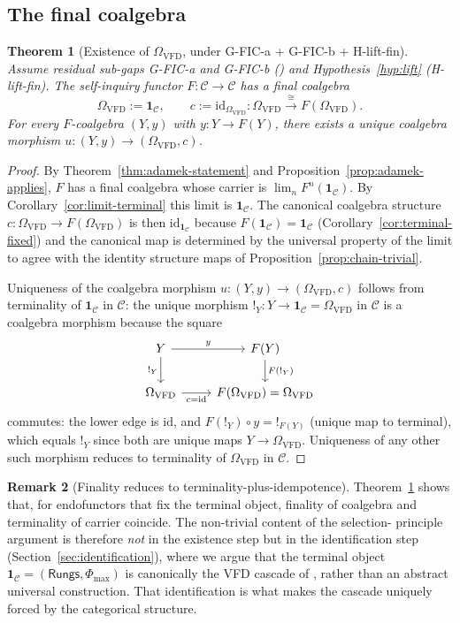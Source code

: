 \documentclass[11pt, a4paper]{amsart}
\newtheorem{theorem}{Theorem}[section]
\theoremstyle{definition}
\newtheorem{remark}[theorem]{Remark}
\newcommand{\Rungs}{\mathsf{Rungs}}
\newcommand{\catC}{\mathcal{C}}
\newcommand{\Omegacap}{\Omega_{\mathrm{VFD}}}
\begin{document}
\subsection{The final coalgebra}

\begin{theorem}[Existence of $\Omegacap$, under G-FIC-a +
  G-FIC-b + H-lift-fin]
\label{thm:existence}
Assume residual sub-gaps G-FIC-a and G-FIC-b
(\cite{CascadeHFICClosure}) and
Hypothesis~\ref{hyp:lift} (H-lift-fin). The self-inquiry
functor $F \colon \catC \to \catC$ has a final coalgebra
\[
    \Omegacap := \mathbf{1}_\catC,
    \qquad
    c := \mathrm{id}_{\Omegacap} \colon \Omegacap
    \xrightarrow{\;\cong\;} F(\Omegacap).
\]
For every $F$-coalgebra $(Y, y)$ with $y \colon Y \to F(Y)$,
there exists a unique coalgebra morphism
$u \colon (Y, y) \to (\Omegacap, c)$.
\end{theorem}

\begin{proof}
By Theorem~\ref{thm:adamek-statement} and
Proposition~\ref{prop:adamek-applies}, $F$ has a final coalgebra
whose carrier is $\lim_n F^n(\mathbf{1}_\catC)$. By
Corollary~\ref{cor:limit-terminal} this limit is
$\mathbf{1}_\catC$. The canonical coalgebra structure
$c \colon \Omegacap \to F(\Omegacap)$ is then
$\mathrm{id}_{\mathbf{1}_\catC}$ because $F(\mathbf{1}_\catC) =
\mathbf{1}_\catC$ (Corollary~\ref{cor:terminal-fixed}) and the
canonical map is determined by the universal property of the
limit to agree with the identity structure maps of
Proposition~\ref{prop:chain-trivial}.

Uniqueness of the coalgebra morphism $u \colon (Y, y) \to
(\Omegacap, c)$ follows from terminality of $\mathbf{1}_\catC$
in $\catC$: the unique morphism $!_Y \colon Y \to
\mathbf{1}_\catC = \Omegacap$ in $\catC$ is a coalgebra morphism
because the square
\[
    \begin{tikzcd}
    Y \arrow[r, "y"] \arrow[d, "!_Y"'] &
      F(Y) \arrow[d, "F(!_Y)"] \\
    \Omegacap \arrow[r, "c = \mathrm{id}"'] &
      F(\Omegacap) = \Omegacap
    \end{tikzcd}
\]
commutes: the lower edge is $\mathrm{id}$, and $F(!_Y) \circ y =
!_{F(Y)}$ (unique map to terminal), which equals $!_Y$ since
both are unique maps $Y \to \Omegacap$. Uniqueness of any other
such morphism reduces to terminality of $\Omegacap$ in $\catC$.
\end{proof}

\begin{remark}[Finality reduces to terminality-plus-idempotence]
\label{rmk:finality-terminal}
Theorem~\ref{thm:existence} shows that, for endofunctors that
fix the terminal object, finality of coalgebra and terminality
of carrier coincide. The non-trivial content of the selection-
principle argument is therefore \emph{not} in the existence
step but in the identification step
(Section~\ref{sec:identification}), where we argue that the
terminal object $\mathbf{1}_\catC = (\Rungs, \Phi_{\max})$ is
canonically the VFD cascade of
\cite{CascadeCompletenessAudit}, rather than an abstract
universal construction. That identification is what makes the
cascade uniquely forced by the categorical structure.
\end{remark}
\end{document}
